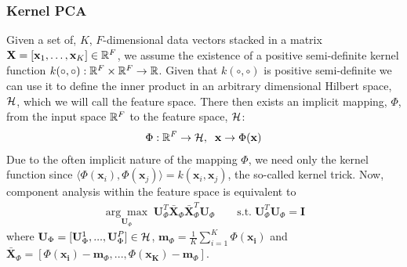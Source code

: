 \subsubsection{Kernel PCA}\label{subsubsec:singl_img_ca_kpca}
Given a set of, $K$, $F$-dimensional data vectors stacked in a
matrix $\mathbf{X} = [\mathbf{x}_1, \ldots, \mathbf{x}_K] \in \mathbb{R}^F$,
we assume the existence of a positive semi-definite kernel function
$k(\circ, \circ) : \mathbb{R}^F \times \mathbb{R}^F \rightarrow \mathbb{R}$. Given that $k(\circ, \circ)$
is positive semi-definite we can use it to define the inner product in an
arbitrary dimensional Hilbert space, $\mathcal{H}$, which we will call the feature
space. There then exists an implicit mapping, $\Phi$, from the input
space $\mathbb{R}^F$ to the feature space, $\mathcal{H}$:
\begin{equation}
    \begin{aligned}\label{eq:implicit-map}
        \Phi : \mathbb{R}^F \rightarrow \mathcal{H}, \; \; \mathbf{x} \rightarrow \Phi(\mathbf{x})
    \end{aligned}
\end{equation}
Due to the often implicit nature of the mapping $\Phi$, we need only the kernel
function since
$\langle \Phi(\mathbf{x}_i), \Phi(\mathbf{x}_j) \rangle  = k (\mathbf{x}_i, \mathbf{x}_j)$,
the so-called kernel trick. Now, component analysis within the feature space
is equivalent to
\begin{equation}
    \begin{aligned}\label{eq:feature-space-pca}
        \underset{\mathbf{U}_\Phi}{\arg\max} \; \mathbf{U}_\Phi^T \bar{\mathbf{X}}_\Phi \bar{\mathbf{X}}_\Phi^T \mathbf{U}_\Phi \qquad \text{s.t.} \; \mathbf{U}_\Phi^T \mathbf{U}_\Phi = \mathbf{I}
    \end{aligned}
\end{equation}
where $\mathbf{U}_\Phi = [\mathbf{U}_\Phi^1, ..., \mathbf{U}_\Phi^P] \in \mathcal{H}$,
$\mathbf{m}_\Phi = \frac{1}{K} \sum \limits_{i=1}^K \Phi(\mathbf{x_i})$ and
$\bar{\mathbf{X}}_\Phi = [\Phi(\mathbf{x_i}) - \mathbf{m}_\Phi, ..., \Phi(\mathbf{x_K}) - \mathbf{m}_\Phi]$.

